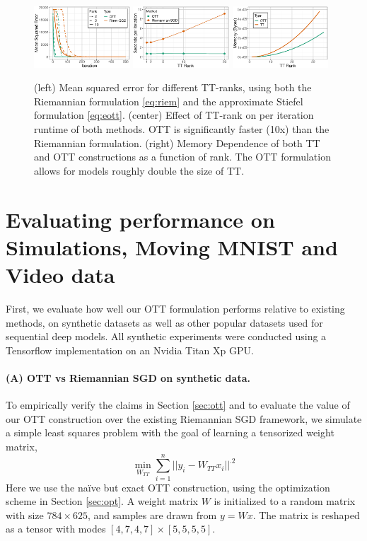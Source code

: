 \begin{figure}
	\centering
	\includegraphics[width=0.32\textwidth]{4_ott/figs/sim/rank_convergence.eps}
	\includegraphics[width=0.32\textwidth]{4_ott/figs/sim/time_comparison.eps}
    \includegraphics[width=0.32\textwidth]{4_ott/figs/sim/mem_vs_rank.eps}
	\caption{\label{fig:riemstief} \footnotesize (left) Mean squared error for different TT-ranks,
          using both the Riemannian formulation \eqref{eq:riem} and the approximate Stiefel formulation \eqref{eq:eott}.
          (center) Effect of TT-rank on per iteration runtime of both methods. OTT is significantly faster (10x)
          than the Riemannian formulation.
          (right) Memory Dependence of both TT and OTT constructions as a function of rank.
          The OTT formulation allows for models roughly double the size of TT.}
\end{figure}

\section{Evaluating performance on Simulations, Moving MNIST and Video data}\label{sec:exps}
First,
we evaluate how well our OTT formulation performs relative to existing methods, on synthetic
datasets as well as other popular datasets used for sequential deep models. 
All synthetic experiments were conducted using a Tensorflow implementation on
an Nvidia Titan Xp GPU. 

\paragraph{(A) OTT vs Riemannian SGD on synthetic data.}
To empirically verify the claims in Section \ref{sec:ott}
and to evaluate the value of our OTT construction over the existing Riemannian SGD framework,
we simulate a simple least squares problem with the goal of learning a tensorized weight matrix,
$$\min_{W_{TT}} \sum_{i=1}^n ||y_i - W_{TT}x_i||^.2$$
Here we use the na\"ive but exact OTT construction,
using the optimization scheme in Section \ref{sec:opt}.
A weight matrix $W$ is initialized to a random matrix with size $784 \times 625$, and samples are drawn from $y=Wx$. The matrix is reshaped as a tensor with modes $[4,7,4,7] \times [5,5,5,5]$.

